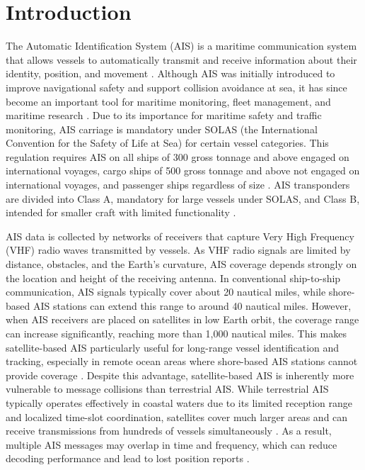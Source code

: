 \documentclass[10pt,a4paper]{article}
\begin{document}
\vspace{0.2cm}


\section{Introduction}

\vspace{0.2cm}

The Automatic Identification System (AIS) is a maritime communication system that allows 
vessels to automatically transmit and receive information about their identity, position, and movement \cite{1}.
Although AIS was initially introduced to improve navigational safety and support collision avoidance at sea, 
it has since become an important tool for maritime monitoring, fleet management, and maritime research \cite{2}.
Due to its importance for maritime safety and traffic monitoring, AIS carriage is mandatory under SOLAS 
(the International Convention for the Safety of Life at Sea) for certain vessel categories. This regulation requires
AIS on all ships of 300 gross tonnage and above engaged on international voyages, cargo ships of 500 gross tonnage 
and above not engaged on international voyages, and passenger ships regardless of size \cite{3}. AIS transponders are divided 
into Class A, mandatory for large vessels under SOLAS, and Class B, intended for smaller craft with limited functionality \cite{1}.

AIS data is collected by networks of receivers that capture Very High Frequency (VHF) radio waves transmitted by vessels.
As VHF radio signals are limited by distance, obstacles, and the Earth's curvature, AIS coverage depends strongly on
the location and height of the receiving antenna. In conventional ship-to-ship communication, AIS signals typically cover 
about 20 nautical miles, while shore-based AIS stations can extend this range to around 40 nautical miles. However, when AIS 
receivers are placed on satellites in low Earth orbit, the coverage range can increase significantly, reaching more than 1,000 
nautical miles. This makes satellite-based AIS particularly useful for long-range vessel identification and tracking, especially
in remote ocean areas where shore-based AIS stations cannot provide coverage \cite{4}. Despite this advantage, satellite-based AIS is 
inherently more vulnerable to message collisions than terrestrial AIS. While terrestrial AIS typically operates effectively in coastal 
waters due to its limited reception range and localized time-slot coordination, satellites cover much larger areas and can receive transmissions 
from hundreds of vessels simultaneously \cite{4,5}. As a result, multiple AIS messages may overlap in time and frequency, which can reduce decoding 
performance and lead to lost position reports \cite{5}.
\end{document}
